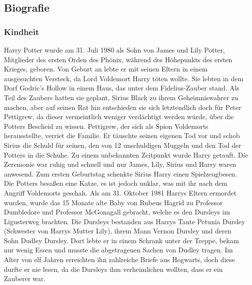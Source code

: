 \documentclass[a4paper, 10pt]{article}
\begin{document}
\subsection*{\Large Biografie}
\vspace{5pt}
\subsubsection*{\large Kindheit}
Harry Potter wurde am 31. Juli 1980 als Sohn von James und Lily Potter, Mitglieder des ersten Orden des Phönix, während des Höhepunkts des ersten Krieges, geboren. Von Geburt an lebte er mit seinen Eltern in einem ausgesuchten Versteck, da Lord Voldemort Harry töten wollte. Sie lebten in dem Dorf Godric's Hollow in einem Haus, das unter dem Fidelius-Zauber stand. Als Teil des Zaubers hatten sie geplant, Sirius Black zu ihrem Geheimniswahrer zu machen, aber auf seinen Rat hin entschieden sie sich letztendlich doch für Peter Pettigrew, da dieser vermeintlich weniger verdächtigt werden würde, über die Potters Bescheid zu wissen. Pettigrew, der sich als Spion Voldemorts herausstellte, verriet die Familie. Er täuschte seinen eigenen Tod vor und schob Sirius die Schuld für seinen, den von 12 unschuldigen Muggeln und den Tod der Potters in die Schuhe.
\vspace{10pt}
\newline
Zu einem unbekannten Zeitpunkt wurde Harry getauft. Die Zeremonie war ruhig und schnell und nur James, Lily, Sirius und Harry waren anwesend. Zum ersten Geburtstag schenkte Sirius Harry einen Spielzeugbesen.
\vspace{10pt}
\newline
Die Potters besaßen eine Katze, es ist jedoch unklar, was mit ihr nach dem Angriff Voldemorts geschah.
\vspace{10pt}
\newline
Als am 31. Oktober 1981 Harrys Eltern ermordet wurden, wurde das 15 Monate alte Baby von Rubeus Hagrid zu Professor Dumbledore und Professor McGonagall gebracht, welche es den Dursleys im Ligusterweg brachten. Die Dursleys bestanden aus Harrys Tante Petunia Dursley (Schwester von Harrys Mutter Lily), ihrem Mann Vernon Dursley und deren Sohn Dudley Dursley.
\vspace{10pt}
\newline
Dort lebte er in einem Schrank unter der Treppe, bekam nur wenig Essen und musste die abgetragenen Sachen von Dudley tragen. Im Alter von elf Jahren erreichten ihn zahlreiche Briefe aus Hogwarts, doch diese durfte er nie lesen, da die Dursleys ihm verheimlichen wollten, dass er ein Zauberer war.
\end{document}
